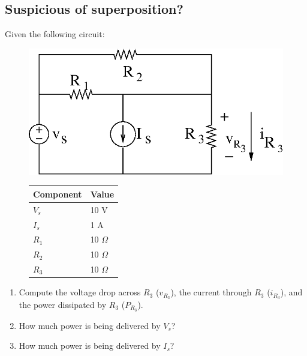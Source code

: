 \subsection*{Suspicious of superposition?}

Given the following circuit:
\begin{figure}[h!]
\begin{minipage}[l]{0.65\linewidth}
\centering
\includegraphics[width=0.6\linewidth]{p2/p2.eps}
\end{minipage}\hfill
\begin{minipage}[l]{0.25\linewidth}
\begin{tabular}{|l|l|}
\hline
Component & Value \\ \hline
$V_s$ & 10 V \\ \hline
$I_s$ & 1 A \\ \hline
$R_1$ & 10 $\Omega$ \\ \hline
$R_2$ & 10 $\Omega$ \\ \hline
$R_3$ & 10 $\Omega$ \\ \hline
\end{tabular}
\end{minipage}
\end{figure}

\begin{enumerate}
    \item Compute the voltage drop across $R_3$ ($v_{R_3}$), the current
        through $R_3$ ($i_{R_3}$), and the power dissipated by $R_3$
        ($P_{R_3}$).  

    \item How much power is being delivered by $V_s$?

    \item How much power is being delivered by $I_s$?
\end{enumerate}

